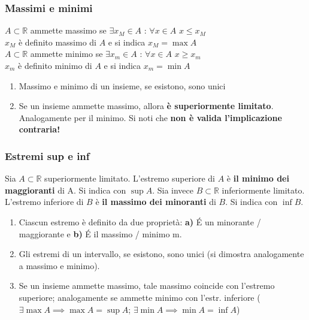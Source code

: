 \documentclass[10pt]{article}
\theoremstyle{plain}
\begin{document}
\subsubsection{Massimi e minimi}
\begin{defin}
    $A \subset \mathbb{R}$ ammette massimo se $\exists x_M \in A$ : $\forall x \in A$ $x \leq x_M$
    \\$x_M$ è definito massimo di $A$ e si indica $x_M = \max A$
    \\$A \subset \mathbb{R}$ ammette minimo se $\exists x_m \in A$ : $\forall x \in A$ $x \geq x_m$
    \\$x_m$ è definito minimo di $A$ e si indica $x_m = \min A$
\end{defin}
\begin{oss}
    \begin{enumerate}
        \item Massimo e minimo di un insieme, se esistono, sono unici
        \item Se un insieme ammette massimo, allora \textbf{è superiormente limitato}. Analogamente per il minimo. Si noti che \textbf{non è valida l'implicazione contraria!}
    \end{enumerate}
\end{oss}

\subsubsection{Estremi sup e inf}
\begin{defin}
    Sia $A \subset \mathbb{R}$ superiormente limitato. L'estremo superiore di $A$ è \textbf{il minimo dei maggioranti} di A. Si indica con $\sup A$.
     Sia invece $B \subset \mathbb{R}$ inferiormente limitato. L'estremo inferiore di $B$ è \textbf{il massimo dei minoranti} di $B$. Si indica con $\inf B$.
\end{defin}
\begin{oss}
    \begin{enumerate}
        \item Ciascun estremo è definito da due proprietà: \textbf{a)} \'E un minorante / maggiorante e \textbf{b)} \'E il massimo / minimo m.
    \item Gli estremi di un intervallo, se esistono, sono unici (si dimostra analogamente a massimo e minimo).
    \item Se un insieme ammette massimo, tale massimo coincide con l'estremo superiore; analogamente se ammette minimo con l'estr. inferiore ($\exists \max A \implies \max A = \sup A$; $\exists \min A \implies \min A = \inf A$)
    \end{enumerate}
\end{oss}
\end{document}
